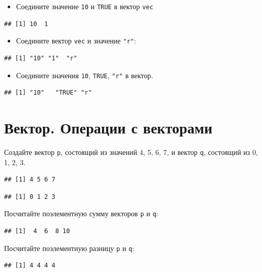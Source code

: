 \documentclass[]{book}
\providecommand{\tightlist}{%
  \setlength{\itemsep}{0pt}\setlength{\parskip}{0pt}}
\begin{document}
\begin{itemize}
\tightlist
\item
  Соедините значение \texttt{10} и \texttt{TRUE} в вектор \texttt{vec}
\end{itemize}

\begin{verbatim}
## [1] 10  1
\end{verbatim}

\begin{itemize}
\tightlist
\item
  Соедините вектор \texttt{vec} и значение \texttt{"r"}:
\end{itemize}

\begin{verbatim}
## [1] "10" "1"  "r"
\end{verbatim}

\begin{itemize}
\tightlist
\item
  Соедините значения \texttt{10}, \texttt{TRUE}, \texttt{"r"} в вектор.
\end{itemize}

\begin{verbatim}
## [1] "10"   "TRUE" "r"
\end{verbatim}

\hypertarget{vec_op}{%
\section{Вектор. Операции с векторами}\label{vec_op}}

Создайте вектор \texttt{p}, состоящий из значений 4, 5, 6, 7, и вектор \texttt{q}, состоящий из 0, 1, 2, 3.

\begin{verbatim}
## [1] 4 5 6 7
\end{verbatim}

\begin{verbatim}
## [1] 0 1 2 3
\end{verbatim}

Посчитайте поэлементную сумму векторов \texttt{p} и \texttt{q}:

\begin{verbatim}
## [1]  4  6  8 10
\end{verbatim}

Посчитайте поэлементную разницу \texttt{p} и \texttt{q}:

\begin{verbatim}
## [1] 4 4 4 4
\end{verbatim}
\end{document}
